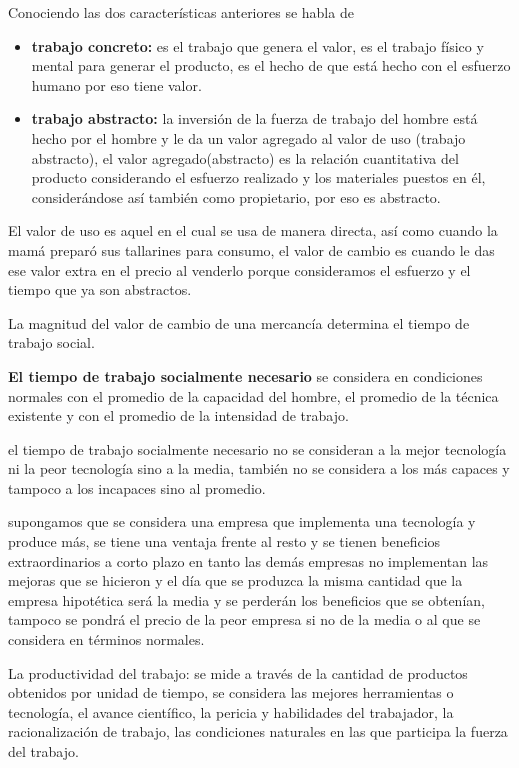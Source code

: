 \documentclass[
  letterpaper,
  DIV=11,
  numbers=noendperiod]{scrartcl}
\begin{document}
Conociendo las dos características anteriores se habla de

\begin{itemize}
\item
  \textbf{trabajo concreto:} es el trabajo que genera el valor, es el
  trabajo físico y mental para generar el producto, es el hecho de que
  está hecho con el esfuerzo humano por eso tiene valor.
\item
  \textbf{trabajo abstracto:} la inversión de la fuerza de trabajo del
  hombre está hecho por el hombre y le da un valor agregado al valor de
  uso (trabajo abstracto), el valor agregado(abstracto) es la relación
  cuantitativa del producto considerando el esfuerzo realizado y los
  materiales puestos en él, considerándose así también como propietario,
  por eso es abstracto.
\end{itemize}

El valor de uso es aquel en el cual se usa de manera directa, así como
cuando la mamá preparó sus tallarines para consumo, el valor de cambio
es cuando le das ese valor extra en el precio al venderlo porque
consideramos el esfuerzo y el tiempo que ya son abstractos.

La magnitud del valor de cambio de una mercancía determina el tiempo de
trabajo social.

\textbf{El tiempo de trabajo socialmente necesario} se considera en
condiciones normales con el promedio de la capacidad del hombre, el
promedio de la técnica existente y con el promedio de la intensidad de
trabajo.

el tiempo de trabajo socialmente necesario no se consideran a la mejor
tecnología ni la peor tecnología sino a la media, también no se
considera a los más capaces y tampoco a los incapaces sino al promedio.

supongamos que se considera una empresa que implementa una tecnología y
produce más, se tiene una ventaja frente al resto y se tienen beneficios
extraordinarios a corto plazo en tanto las demás empresas no implementan
las mejoras que se hicieron y el día que se produzca la misma cantidad
que la empresa hipotética será la media y se perderán los beneficios que
se obtenían, tampoco se pondrá el precio de la peor empresa si no de la
media o al que se considera en términos normales.

La productividad del trabajo: se mide a través de la cantidad de
productos obtenidos por unidad de tiempo, se considera las mejores
herramientas o tecnología, el avance científico, la pericia y
habilidades del trabajador, la racionalización de trabajo, las
condiciones naturales en las que participa la fuerza del trabajo.
\end{document}
